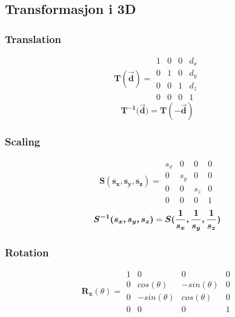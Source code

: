 \subsection{Transformasjon i 3D}

\subsubsection{Translation}

\begin{equation} \label{eq:translation_matrix}
    \boldsymbol{T(\vec{d})} = 
   \begin{matrix}
        1 & 0 & 0 & d_x \\
        0 & 1 & 0 & d_y \\
        0 & 0 & 1 & d_z \\
        0 & 0 & 0 & 1
    \end{matrix}
\end{equation}
\begin{equation}
    \boldsymbol{T^{-1}(\vec{d}}) = \boldsymbol{T(-\vec{d})}
\end{equation}


\subsubsection{Scaling}

\begin{equation} \label{eq:scaling_matrix}
    \boldsymbol{S(s_x, s_y, s_z)} = 
   \begin{matrix}
        s_x & 0 & 0 & 0 \\
        0 & s_y & 0 & 0 \\
        0 & 0 & s_z & 0 \\
        0 & 0 & 0 & 1
    \end{matrix}
\end{equation}
\begin{equation}
    \boldsymbol{S^{-1}(s_x, s_y, s_z)} = \boldsymbol{S({1 \over s_x}, {1 \over s_y}, {1 \over s_z})}
\end{equation}

\subsubsection{Rotation}

\begin{equation}
    \boldsymbol{R_x}(\theta) =
    \begin{matrix}
        1 & 0 & 0 & 0 \\
        0 & cos(\theta) & -sin(\theta) & 0 \\
        0 & -sin(\theta) & cos(\theta) & 0 \\
        0 & 0 & 0 & 1
    \end{matrix}
\end{equation}

